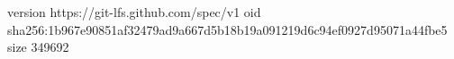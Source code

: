 version https://git-lfs.github.com/spec/v1
oid sha256:1b967e90851af32479ad9a667d5b18b19a091219d6c94ef0927d95071a44fbe5
size 349692
